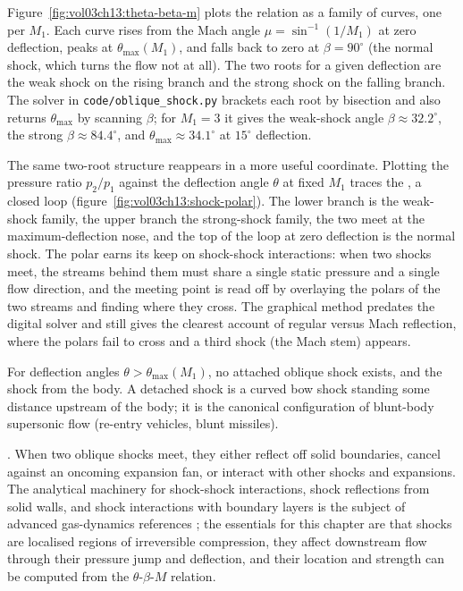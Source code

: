 Figure~\ref{fig:vol03ch13:theta-beta-m} plots the relation as a
family of curves, one per $M_1$. Each curve rises from the Mach angle
$\mu = \sin^{-1}(1/M_1)$ at zero deflection, peaks at
$\theta_{\max}(M_1)$, and falls back to zero at $\beta = 90^{\circ}$
(the normal shock, which turns the flow not at all). The two roots for
a given deflection are the weak shock on the rising branch and the
strong shock on the falling branch. The solver in
\texttt{code/oblique\_shock.py} brackets each root by bisection and
also returns $\theta_{\max}$ by scanning $\beta$; for $M_1 = 3$ it
gives the weak-shock angle $\beta \approx 32.2^{\circ}$, the strong
$\beta \approx 84.4^{\circ}$, and $\theta_{\max} \approx 34.1^{\circ}$
at $15^{\circ}$ deflection.



The same two-root structure reappears in a more useful coordinate.
Plotting the pressure ratio $p_2/p_1$ against the deflection angle
$\theta$ at fixed $M_1$ traces the , a closed
loop (figure~\ref{fig:vol03ch13:shock-polar}). The lower branch is
the weak-shock family, the upper branch the strong-shock family, the
two meet at the maximum-deflection nose, and the top of the loop at
zero deflection is the normal shock. The polar earns its keep on
shock-shock interactions: when two shocks meet, the streams behind
them must share a single static pressure and a single flow
direction, and the meeting point is read off by overlaying the
polars of the two streams and finding where they cross. The
graphical method predates the digital solver and still gives the
clearest account of regular versus Mach reflection, where the polars
fail to cross and a third shock (the Mach stem) appears.

For deflection angles $\theta > \theta_{\max}(M_1)$, no attached
oblique shock exists, and the shock  from the
body. A detached shock is a curved bow shock standing some
distance upstream of the body; it is the canonical configuration
of blunt-body supersonic flow (re-entry vehicles, blunt missiles).

. When two oblique shocks meet, they
either reflect off solid boundaries, cancel against an oncoming
expansion fan, or interact with other shocks and expansions. The
analytical machinery for shock-shock interactions, shock reflections
from solid walls, and shock interactions with boundary layers is
the subject of advanced gas-dynamics references
\cite{text:anderson-aerodynamics}; the essentials for this chapter
are that shocks are localised regions of irreversible compression,
they affect downstream flow through their pressure jump and
deflection, and their location and strength can be computed from
the $\theta$-$\beta$-$M$ relation.


